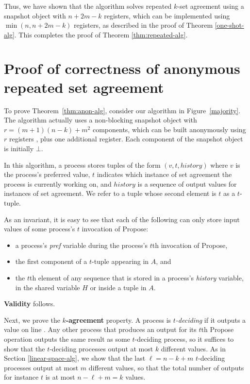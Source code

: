 \documentclass[11pt]{article}
\newcounter{linenum}
\newcounter{ind}
\newcommand{\lref}[1]{\linenumref{#1}}
\begin{document}
Thus, we have shown that the algorithm solves repeated $k$-set agreement using
a snapshot object with $n+2m-k$ registers, which can be implemented using
$\min(n,n+2m-k)$ registers, as described in the proof of Theorem \ref{one-shot-alg}.
This completes the proof of Theorem \ref{thm:repeated-alg}.



 


\section{Proof of correctness of anonymous repeated set agreement}
\label{anonymous-alg}
\indent

To prove Theorem~\ref{thm:anon-alg}, consider our algorithm
in Figure~\ref{majority}.
The algorithm actually uses a non-blocking snapshot object with $r=(m+1)(n-k)+m^2$ components,
which can be built anonymously using $r$ registers \cite{GR07}, plus one additional register.
Each component of the snapshot object is initially $\bot$.

In this algorithm, a process stores tuples of the form $(v,t,history)$ where 
$v$ is the process's preferred value, $t$ indicates which instance of set
agreement the process is currently working on, and $history$ is a sequence
of output values for instances of set agreement.  We refer to a tuple whose
second element is $t$ as a $t$-tuple.

As an invariant, it is easy to see that each of the following can only store input values
of some process's $t$ invocation of {\sc Propose}:
\begin{itemize}
\item
a process's {\it pref} variable during the process's $t$th invocation of {\sc Propose},
\item
the first component of a $t$-tuple appearing in $A$, and
\item
the $t$th element of any sequence that is stored in a process's {\it history} variable, in the shared variable $H$ or inside a tuple in $A$.
\end{itemize}
{\bf Validity} follows.

Next, we prove the {\bf $k$-agreement} property.
A process is \emph{$t$-deciding} if it outputs a value on line \lref{output-anon}.
Any other process that produces an output for its $t$th {\sc Propose} operation
outputs the same result as some $t$-deciding process, so it suffices to show
that the $t$-deciding processes output at most $k$ different values.
As in Section \ref{linear-space-alg}, we show that the last $\ell=n-k+m$ $t$-deciding processes output at most $m$ different values, so that the total number of outputs for instance $t$ is at most $n-\ell+m=k$ values.
\end{document}
